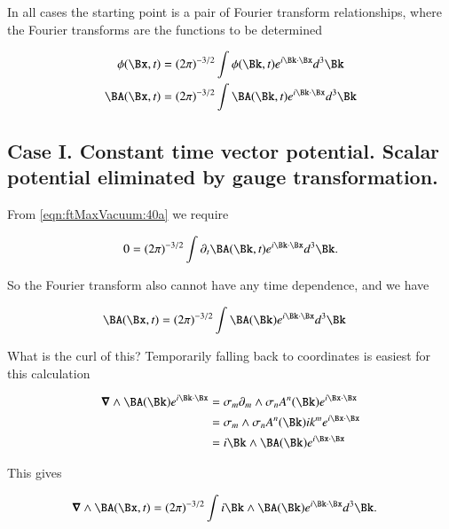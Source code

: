 In all cases the starting point is a pair of Fourier transform relationships, where the Fourier transforms are the functions to be determined

\begin{subequations}
\label{eqn:ftMaxVacuum:40}
\begin{align}
\phi(\Bx, t) &= (2 \pi)^{-3/2} \int \phi(\Bk, t) e^{i \Bk \cdot \Bx } d^3 \Bk 
\label{eqn:ftMaxVacuum:40a}
\\
\BA(\Bx, t) &= (2 \pi)^{-3/2} \int \BA(\Bk, t) e^{i \Bk \cdot \Bx } d^3 \Bk 
\label{eqn:ftMaxVacuum:40b}
\end{align}
\end{subequations}

\subsection{Case I.  Constant time vector potential.  Scalar potential eliminated by gauge transformation.}

From \autoref{eqn:ftMaxVacuum:40a} we require

\begin{align}\label{eqn:ftMaxVacuum:50}
0 = (2 \pi)^{-3/2} \int \partial_t \BA(\Bk, t) e^{i \Bk \cdot \Bx } d^3 \Bk.
\end{align}

So the Fourier transform also cannot have any time dependence, and we have

\begin{align}\label{eqn:ftMaxVacuum:51}
\BA(\Bx, t) &= (2 \pi)^{-3/2} \int \BA(\Bk) e^{i \Bk \cdot \Bx } d^3 \Bk 
\end{align}

What is the curl of this?  Temporarily falling back to coordinates is easiest for this calculation

\begin{align*}
\spacegrad \wedge \BA(\Bk) e^{i\Bk \cdot \Bx}
&=
\sigma_m \partial_m \wedge \sigma_n A^n(\Bk) e^{i \Bx \cdot \Bx} \\
&=
\sigma_m \wedge \sigma_n A^n(\Bk) i k^m e^{i \Bx \cdot \Bx} \\
&=
i\Bk \wedge \BA(\Bk) e^{i \Bx \cdot \Bx} \\
\end{align*}

This gives

\begin{align}\label{eqn:ftMaxVacuum:52}
\spacegrad \wedge \BA(\Bx, t) &= (2 \pi)^{-3/2} \int i \Bk \wedge \BA(\Bk) e^{i \Bk \cdot \Bx } d^3 \Bk.
\end{align}

